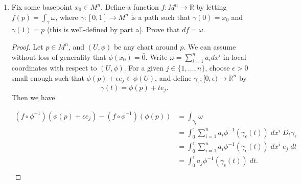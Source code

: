 \documentclass{article}
\begin{document}
\begin{enumerate}[label={\bf Q\arabic*:}]
\begin{enumerate}
\begin{proof}
          Then $\gamma$ is a smooth path, even at $t=1$, because
          $h\restriction[0,t_0]=0$ and $h\restriction[t_1,1]=1$,
          there will be an open interval containing
          $t=1$ where $\gamma$ is constant. Furthermore, $\gamma$ is a
          closed path, so from assumption $\int_\gamma\omega=0$. Now
          \begin{align*}
            0 &=\int_\gamma\omega \\
              &=\int_{\gamma_1\circ h}\omega - \int_{\gamma_2\circ h}\omega
                \\
              &=\int_{\gamma_1}\omega - \int_{\gamma_2}\omega &(\text{from
                Question 1}), \\
          \end{align*}
          and so $\int_{\gamma_1}\omega=\int_{\gamma_2}\omega$ as required.
        \end{proof}

      \item Fix some basepoint $x_0\in M^n$. Define a function
        $f:M^n\rightarrow\mathbb{R}$ by letting $f(p)=\int_\gamma\omega$,
        where $\gamma:[0,1]\rightarrow M^n$ is a path such that
        $\gamma(0)=x_0$ and $\gamma(1)=p$ (this is well-defined by part a).
        Prove that $df=\omega$.

        \begin{proof}
          Let $p\in M^n$, and $(U,\phi)$ be any chart around $p$. We can
          assume without loss of generality that $\phi(x_0)=\bar{0}$.
          Write $\omega =\sum_{i=1}^n a_idx^i$ in local coordinates with
          respect to $(U,\phi)$. For a given $j\in\{1,\ldots,n\}$, choose
          $\epsilon>0$ small enough such that $\phi(p)+\epsilon
          e_j\in\phi(U)$, and define
          $\gamma_\epsilon:[0,\epsilon)\rightarrow\mathbb{R}^n$ by
          \[\gamma(t) =\phi(p)+t e_j.\] Then we have

          \begin{align*}
            (f\circ\phi^{-1})(\phi(p)+\epsilon e_j)
              -(f\circ\phi^{-1})(\phi(p))
              &=\int_{\gamma_\epsilon}\omega \\
              &=\int_0^{\epsilon} \sum_{i=1}^n
                a_i\phi^{-1}(\gamma_\epsilon(t))\; dx^i\;
                D_t\gamma_\epsilon \\
              &=\int_0^{\epsilon} \sum_{i=1}^n
                a_i\phi^{-1}(\gamma_\epsilon(t))\; dx^i\; e_j\; dt \\
              &=\int_0^{\epsilon} a_j\phi^{-1}(\gamma_\epsilon(t))\; dt. \\
          \end{align*}


\end{proof}
\end{enumerate}
\end{enumerate}
\end{document}
